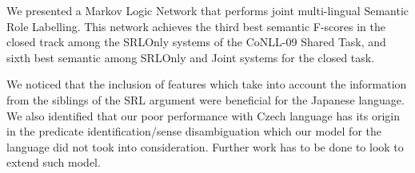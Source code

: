 

We presented a Markov Logic Network that performs joint multi-lingual Semantic 
Role Labelling. This network achieves the third best semantic F-scores in the 
closed track among the SRLOnly systems of the CoNLL-09 Shared Task, and sixth 
best semantic among SRLOnly and Joint systems for the closed task.

We noticed that the inclusion of features which take into account the 
information from the siblings of the SRL argument were beneficial for the 
Japanese language. We also identified that our poor performance with Czech 
language has its origin in the predicate identification/sense disambiguation 
which our model for the language did not took into consideration. Further work 
has to be done to look to extend such model. 
